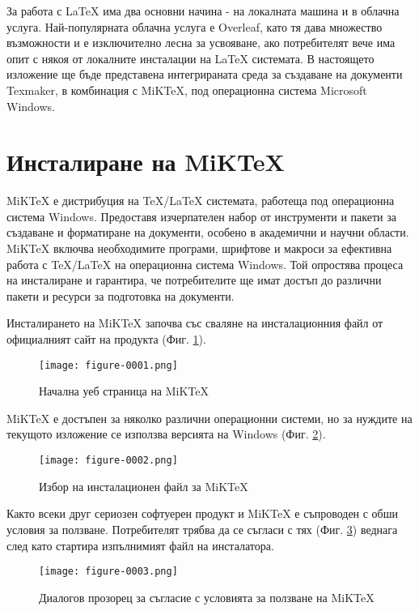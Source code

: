 За работа с LaTeX има два основни начина - на локалната машина и в облачна услуга. Най-популярната облачна услуга е Overleaf, като тя дава множество възможности и е изключително лесна за усвояване, ако потребителят вече има опит с някоя от локалните инсталации на LaTeX системата. В настоящето изложение ще бъде представена интегрираната среда за създаване на документи Texmaker, в комбинация с MiKTeX, под операционна система Microsoft Windows.

\section{Инсталиране на MiKTeX}

MiKTeX е дистрибуция на TeX/LaTeX системата, работеща под операционна система Windows. Предоставя изчерпателен набор от инструменти и пакети за създаване и форматиране на документи, особено в академични и научни области. MiKTeX включва необходимите програми, шрифтове и макроси за ефективна работа с TeX/LaTeX на операционна система Windows. Той опростява процеса на инсталиране и гарантира, че потребителите ще имат достъп до различни пакети и ресурси за подготовка на документи.

Инсталирането на MiKTeX започва със сваляне на инсталационния файл от официалният сайт на продукта (Фиг. \ref{figure-0001}).

\begin{figure}
  \centering
  \texttt{[image: figure-0001.png]}
  \caption{Начална уеб страница на MiKTeX}
\label{figure-0001}
\end{figure}

MiKTeX е достъпен за няколко различни операционни системи, но за нуждите на текущото изложение се използва версията на Windows (Фиг. \ref{figure-0002}).

\begin{figure}
  \centering
  \texttt{[image: figure-0002.png]}
  \caption{Избор на инсталационен файл за MiKTeX}
\label{figure-0002}
\end{figure}

Както всеки друг сериозен софтуерен продукт и MiKTeX е съпроводен с обши условия за ползване. Потребителят трябва да се съгласи с тях (Фиг. \ref{figure-0003}) веднага след като стартира изпълнимият файл на инсталатора.

\begin{figure}
  \centering
  \texttt{[image: figure-0003.png]}
  \caption{Диалогов прозорец за съгласие с условията за ползване на MiKTeX}
\label{figure-0003}
\end{figure}

